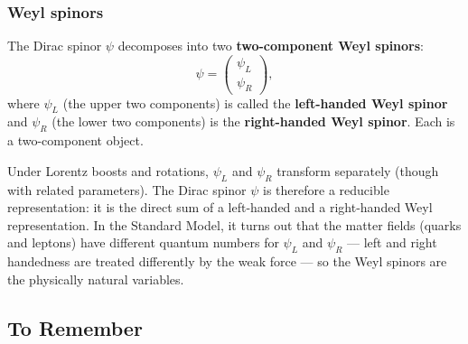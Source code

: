 \documentclass[../main.tex]{subfiles}
\begin{document}
\subsubsection*{Weyl spinors}

The Dirac spinor $\psi$ decomposes into two \textbf{two-component Weyl spinors}:
\begin{equation}
  \psi = \begin{pmatrix}\psi_L \\ \psi_R\end{pmatrix},
  \label{eq:lec07:Weyl-decomp}
\end{equation}
where $\psi_L$ (the upper two components) is called the \textbf{left-handed Weyl spinor} and $\psi_R$ (the lower two components) is the \textbf{right-handed Weyl spinor}.  Each is a two-component object.


\begin{remark}
Under Lorentz boosts and rotations, $\psi_L$ and $\psi_R$ transform separately (though with related parameters).  The Dirac spinor $\psi$ is therefore a reducible representation: it is the direct sum of a left-handed and a right-handed Weyl representation.  In the Standard Model, it turns out that the matter fields (quarks and leptons) have different quantum numbers for $\psi_L$ and $\psi_R$ — left and right handedness are treated differently by the weak force — so the Weyl spinors are the physically natural variables.
\end{remark}

\subsection*{To Remember}
\end{document}
